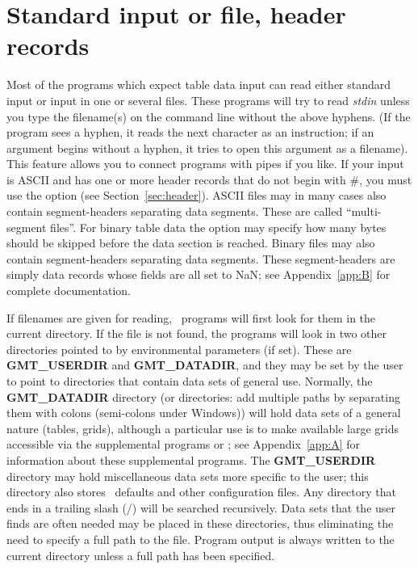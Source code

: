\section{Standard input or file, header records}

Most of the programs which expect table data input can read
either standard input or input in one or several files.
These programs will try to read \emph{stdin} unless you type
the filename(s) on the command line without the above hyphens.
(If the program sees a hyphen, it reads the next character
as an instruction; if an argument begins without a hyphen,
it tries to open this argument as a filename).
This feature allows you to connect programs with pipes if
you like.  If your input is ASCII and has one or more header
records that do not begin with \#, you must use the 
option (see Section~\ref{sec:header}).
ASCII files may in many cases also contain segment-headers
separating data segments.  These are called ``multi-segment files''.
For binary table data the  option may specify how many bytes should
be skipped before the data section is reached.
Binary files may also contain segment-headers
separating data segments.  These segment-headers are simply data records
whose fields are all set to NaN;
see Appendix~\ref{app:B} for complete documentation.

If filenames are given for reading, \GMT\ programs will first look for them in the
current directory.  If the file is not found, the programs
will look in two other directories pointed to by environmental
parameters (if set).  These are \textbf{GMT\_USERDIR} and
\textbf{GMT\_DATADIR}, and they may be set by the user to point to directories
that contain data sets of general use.  Normally, the \textbf{GMT\_DATADIR} directory (or directories:
add multiple paths by separating them with colons (semi-colons under Windows)) will
hold data sets of a general nature (tables, grids), although a particular use
is to make available large grids accessible via the supplemental programs 
or ; see Appendix~\ref{app:A} for information
about these supplemental programs.  The \textbf{GMT\_USERDIR} directory may hold miscellaneous
data sets more specific to the user; this directory also stores \GMT\ defaults and other
configuration files.  Any directory that ends in a trailing slash (/) will be searched
recursively.  Data sets that the user finds are often needed
may be placed in these directories, thus eliminating the need to specify
a full path to the file.  Program output is always written to the
current directory unless a full path has been specified.

